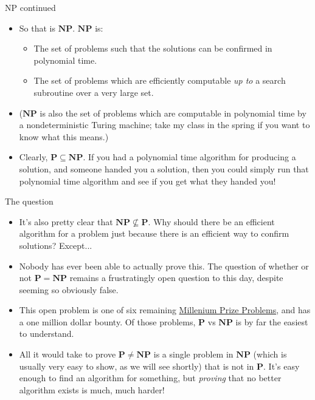 \documentclass{beamer}
\begin{document}
\begin{frame}{NP continued}
    \begin{itemize}
        \item So that is $\mathbf{NP}$. $\mathbf{NP}$ is:
        \begin{itemize}
            \item The set of problems such that the solutions can be confirmed in polynomial time.
            \item The set of problems which are efficiently computable \emph{up to} a search subroutine over a very large set.
        \end{itemize}
        \item ($\mathbf{NP}$ is also the set of problems which are computable in polynomial time by a nondeterministic Turing machine; take my class in the spring if you want to know what this means.) 
        \item Clearly, $\mathbf{P} \subseteq \mathbf{NP}$. If you had a polynomial time algorithm for producing a solution, and someone handed you a solution, then you could simply run that polynomial time algorithm and see if you get what they handed you!
    \end{itemize}
\end{frame}

\begin{frame}{The question}
    \begin{itemize}
        \item It's also pretty clear that $\mathbf{NP} \nsubseteq \mathbf{P}$. Why should there be an efficient algorithm for a problem just because there is an efficient way to confirm solutions? Except...
        \item Nobody has ever been able to actually prove this. The question of whether or not $\mathbf{P} = \mathbf{NP}$ remains a frustratingly open question to this day, despite seeming so obviously false. \pause 
        \item This open problem is one of six remaining \href{https://en.wikipedia.org/wiki/Millennium_Prize_Problems}{Millenium Prize Problems}, and has a one million dollar bounty. Of those problems, $\mathbf{P}$ vs $\mathbf{NP}$ is by far the easiest to understand. \pause 
        \item All it would take to prove $\mathbf{P} \neq \mathbf{NP}$ is a single problem in $\mathbf{NP}$ (which is usually very easy to show, as we will see shortly) that is not in $\mathbf{P}$. It's easy enough to find an algorithm for something, but \emph{proving} that no better algorithm exists is much, much harder! 
    \end{itemize}
\end{frame}
\end{document}
